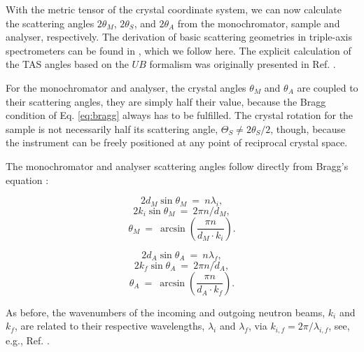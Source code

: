 With the metric tensor \cite[pp. 807-809]{Arens2015} of the crystal coordinate system, we can now calculate the scattering angles
$2 \theta_M$, $2 \theta_S$, and $2 \theta_A$ from the monochromator, sample and analyser, respectively. 
The derivation of basic scattering geometries in triple-axis spectrometers can be found in \cite[Ch. 1.3]{Shirane2002},
which we follow here. 
The explicit calculation of the TAS angles based on the $UB$ formalism was originally presented in Ref. \cite{Lumsden2005}.

For the monochromator and analyser, the crystal angles $\theta_M$ and $\theta_A$ are coupled to 
their scattering angles, they are simply half their value, because the Bragg condition of Eq. \ref{eq:bragg}
always has to be fulfilled.
The crystal rotation for the sample is not necessarily half its scattering angle, $\Theta_S \ne 2\theta_S/2$, 
though, because the instrument can be freely positioned at any point of reciprocal crystal space.

The monochromator and analyser scattering angles follow directly from Bragg's equation 
\cite[p. 68]{Gross2012} \cite[p. 13]{Shirane2002}:

\begin{minipage}{0.45\textwidth}
	\centering
	\begin{equation} 2 d_{M}\sin \theta_{M} \ =\  n \lambda_{i}, \end{equation}
	\begin{equation} 2 k_{i} \sin \theta_{M} \ =\  2 \pi n / d_{M}, \end{equation}
	\begin{equation} \boxed{ \theta_{M} \ =\  \arcsin \left( \frac{\pi n}{d_{M} \cdot k_{i}} \right). } \end{equation}
\end{minipage}
\begin{minipage}{0.45\textwidth}
	\centering
	\begin{equation} 2 d_{A}\sin \theta_{A} \ =\  n \lambda_{f}, \end{equation}
	\begin{equation} 2 k_{f} \sin \theta_{A} \ =\  2 \pi n / d_{A}, \end{equation}
	\begin{equation} \boxed{ \theta_{A} \ =\  \arcsin \left( \frac{\pi n}{d_{A} \cdot k_{f}} \right). } \end{equation}
\end{minipage}

As before, the wavenumbers of the incoming and outgoing neutron beams, $k_{i}$ and $k_{f}$, are related to their
respective wavelengths, $\lambda_{i}$ and $\lambda_{f}$, via $k_{i,f}=2\pi/\lambda_{i,f}$, see, e.g., Ref. \cite[p. 66]{Gross2012}.

